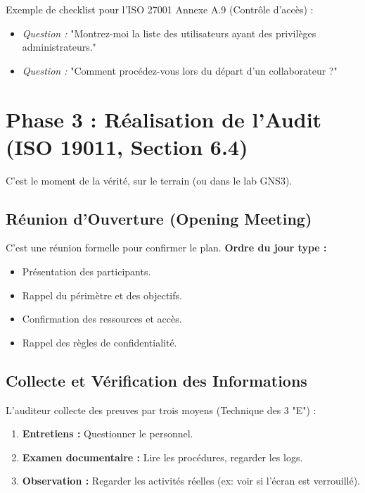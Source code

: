 Exemple de checklist pour l'ISO 27001 Annexe A.9 (Contrôle d'accès) :
\begin{itemize}
    \item \textit{Question :} "Montrez-moi la liste des utilisateurs ayant des privilèges administrateurs."
    \item \textit{Question :} "Comment procédez-vous lors du départ d'un collaborateur ?"
\end{itemize}

\section{Phase 3 : Réalisation de l'Audit (ISO 19011, Section 6.4)}

C'est le moment de la vérité, sur le terrain (ou dans le lab GNS3).

\subsection{Réunion d'Ouverture (Opening Meeting)}

C'est une réunion formelle pour confirmer le plan.
\textbf{Ordre du jour type :}
\begin{itemize}
    \item Présentation des participants.
    \item Rappel du périmètre et des objectifs.
    \item Confirmation des ressources et accès.
    \item Rappel des règles de confidentialité.
\end{itemize}

\subsection{Collecte et Vérification des Informations}

L'auditeur collecte des preuves par trois moyens (Technique des 3 "E") :
\begin{enumerate}
    \item \textbf{Entretiens :} Questionner le personnel.
    \item \textbf{Examen documentaire :} Lire les procédures, regarder les logs.
    \item \textbf{Observation :} Regarder les activités réelles (ex: voir si l'écran est verrouillé).
\end{enumerate}


